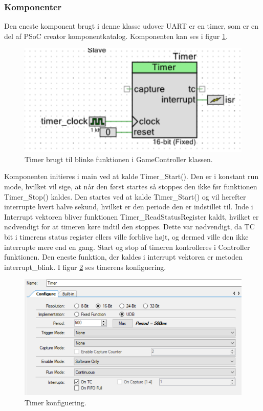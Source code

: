 \documentclass[Softwaredesign/Softwaredesign_main.tex]{subfiles}
\begin{document}
\subsubsection{Komponenter}
Den eneste komponent brugt i denne klasse udover UART er en timer, som er en del af PSoC creator komponentkatalog. Komponenten kan ses i figur \ref{fig:Timer}.
\begin{figure}
    \centering 
    \includegraphics[width=\linewidth]{Softwaredesign/GameController/graphic/gamecontroller_timer.PNG}
    \caption{Timer brugt til blinke funktionen i GameController klassen.}
    \label{fig:Timer}
\end{figure}
Komponenten initieres i main ved at kalde Timer\_Start(). Den er i konstant run mode, hvilket vil sige, at når den først startes så stoppes den ikke før funktionen Timer\_Stop() kaldes. Den startes ved at kalde Timer\_Start() og vil herefter interrupte hvert halve sekund, hvilket er den periode den er indstillet til. Inde i Interrupt vektoren bliver funktionen Timer\_ReadStatusRegister kaldt, hvilket er nødvendigt for at timeren køre indtil den stoppes. Dette var nødvendigt, da TC bit i timerens status register  ellers ville forblive højt, og dermed ville den ikke interrupte mere end en gang. Start og stop af timeren kontrolleres i Controller funktionen. Den eneste funktion, der kaldes i interrupt vektoren er metoden interrupt\_blink. I figur \ref{fig:Timer_setting} ses timerens konfiguering.
\begin{figure}
    \centering 
    \includegraphics[width=\linewidth]{Softwaredesign/GameController/graphic/timer_settings.PNG}
    \caption{Timer konfiguering.}
    \label{fig:Timer_setting}
\end{figure}
\end{document}
